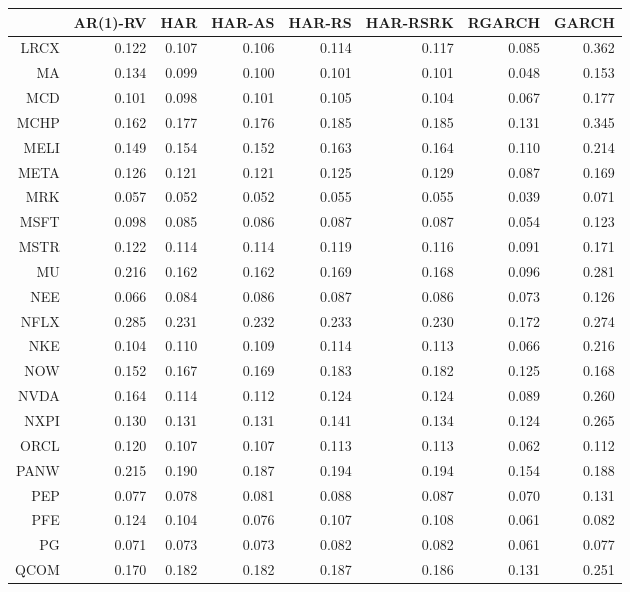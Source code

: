 \begin{table}[ht]
\centering
\begin{tabular}{rrrrrrrr}
  \hline
 & AR(1)-RV & HAR & HAR-AS & HAR-RS & HAR-RSRK & RGARCH & GARCH \\ 
  \hline
LRCX & 0.122 & 0.107 & 0.106 & 0.114 & 0.117 & 0.085 & 0.362 \\ 
  MA & 0.134 & 0.099 & 0.100 & 0.101 & 0.101 & 0.048 & 0.153 \\ 
  MCD & 0.101 & 0.098 & 0.101 & 0.105 & 0.104 & 0.067 & 0.177 \\ 
  MCHP & 0.162 & 0.177 & 0.176 & 0.185 & 0.185 & 0.131 & 0.345 \\ 
  MELI & 0.149 & 0.154 & 0.152 & 0.163 & 0.164 & 0.110 & 0.214 \\ 
  META & 0.126 & 0.121 & 0.121 & 0.125 & 0.129 & 0.087 & 0.169 \\ 
  MRK & 0.057 & 0.052 & 0.052 & 0.055 & 0.055 & 0.039 & 0.071 \\ 
  MSFT & 0.098 & 0.085 & 0.086 & 0.087 & 0.087 & 0.054 & 0.123 \\ 
  MSTR & 0.122 & 0.114 & 0.114 & 0.119 & 0.116 & 0.091 & 0.171 \\ 
  MU & 0.216 & 0.162 & 0.162 & 0.169 & 0.168 & 0.096 & 0.281 \\ 
  NEE & 0.066 & 0.084 & 0.086 & 0.087 & 0.086 & 0.073 & 0.126 \\ 
  NFLX & 0.285 & 0.231 & 0.232 & 0.233 & 0.230 & 0.172 & 0.274 \\ 
  NKE & 0.104 & 0.110 & 0.109 & 0.114 & 0.113 & 0.066 & 0.216 \\ 
  NOW & 0.152 & 0.167 & 0.169 & 0.183 & 0.182 & 0.125 & 0.168 \\ 
  NVDA & 0.164 & 0.114 & 0.112 & 0.124 & 0.124 & 0.089 & 0.260 \\ 
  NXPI & 0.130 & 0.131 & 0.131 & 0.141 & 0.134 & 0.124 & 0.265 \\ 
  ORCL & 0.120 & 0.107 & 0.107 & 0.113 & 0.113 & 0.062 & 0.112 \\ 
  PANW & 0.215 & 0.190 & 0.187 & 0.194 & 0.194 & 0.154 & 0.188 \\ 
  PEP & 0.077 & 0.078 & 0.081 & 0.088 & 0.087 & 0.070 & 0.131 \\ 
  PFE & 0.124 & 0.104 & 0.076 & 0.107 & 0.108 & 0.061 & 0.082 \\ 
  PG & 0.071 & 0.073 & 0.073 & 0.082 & 0.082 & 0.061 & 0.077 \\ 
  QCOM & 0.170 & 0.182 & 0.182 & 0.187 & 0.186 & 0.131 & 0.251 \\ 

\end{tabular}
\end{table}

